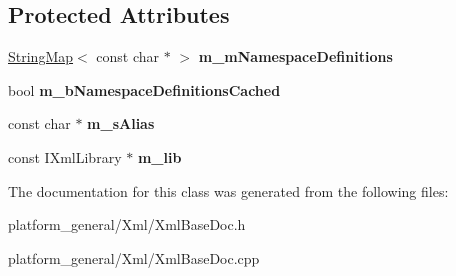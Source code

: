\subsection*{\-Protected \-Attributes}
\begin{DoxyCompactItemize}
\item 
\hypertarget{classgeneral__server_1_1XmlBaseDoc_a90bad477f088af026af178f177d364c9}{\hyperlink{classgeneral__server_1_1StringMap}{\-String\-Map}$<$ const char $\ast$ $>$ {\bfseries m\-\_\-m\-Namespace\-Definitions}}\label{classgeneral__server_1_1XmlBaseDoc_a90bad477f088af026af178f177d364c9}

\item 
\hypertarget{classgeneral__server_1_1XmlBaseDoc_a87277b1ad75ae807eb015d9a8c85f5bd}{bool {\bfseries m\-\_\-b\-Namespace\-Definitions\-Cached}}\label{classgeneral__server_1_1XmlBaseDoc_a87277b1ad75ae807eb015d9a8c85f5bd}

\item 
\hypertarget{classgeneral__server_1_1XmlBaseDoc_a79d64d8ca06b1f03c930329ffb7594ca}{const char $\ast$ {\bfseries m\-\_\-s\-Alias}}\label{classgeneral__server_1_1XmlBaseDoc_a79d64d8ca06b1f03c930329ffb7594ca}

\item 
\hypertarget{classgeneral__server_1_1XmlBaseDoc_ac4a8e8aec7917f42f21a8a171c3a01c2}{const \-I\-Xml\-Library $\ast$ {\bfseries m\-\_\-lib}}\label{classgeneral__server_1_1XmlBaseDoc_ac4a8e8aec7917f42f21a8a171c3a01c2}

\end{DoxyCompactItemize}


\-The documentation for this class was generated from the following files\-:\begin{DoxyCompactItemize}
\item 
platform\-\_\-general/\-Xml/\-Xml\-Base\-Doc.\-h\item 
platform\-\_\-general/\-Xml/\-Xml\-Base\-Doc.\-cpp\end{DoxyCompactItemize}
